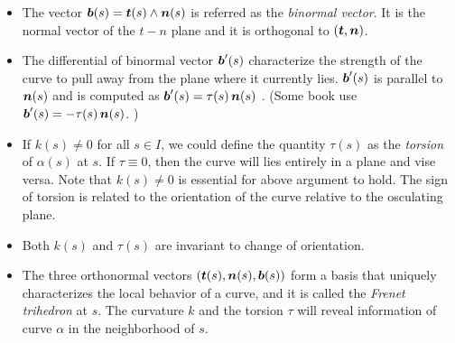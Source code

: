 \documentclass[11pt]{article}
\begin{document}
\begin{itemize}
\item \begin{definition}
The vector $\boldsymbol{b}(s) = \boldsymbol{t}(s) \wedge \boldsymbol{n}(s)$ is referred as the \emph{binormal vector}. It is the normal vector of the $t-n$ plane and it is orthogonal to $(\boldsymbol{t}, \boldsymbol{n})$. 
\end{definition}

\item The differential of binormal vector $\boldsymbol{b}'(s)$ characterize the strength of the curve to pull away from the plane where it currently lies. $\boldsymbol{b}'(s)$ is parallel to $\boldsymbol{n}(s)$ and is computed as $\boldsymbol{b}'(s) = \tau(s)\,\boldsymbol{n}(s)$ \citep{do1976differential}. (Some book use $\boldsymbol{b}'(s) = -\tau(s)\,\boldsymbol{n}(s)$. )

\item If $k(s)\neq 0$ for all $s\in I$, we could define the quantity $\tau(s)$ as the \emph{torsion} of $\alpha(s)$ at $s$. If $\tau \equiv 0$, then the curve will lies entirely in a plane and vise versa.   Note that $k(s)\neq 0$ is essential for above argument to hold. The sign of torsion is related to the orientation of the curve relative to the osculating plane. 

\item Both $k(s)$ and $\tau(s)$ are invariant to change of orientation. 

\item  \begin{definition}
The three orthonormal vectors $(\boldsymbol{t}(s), \boldsymbol{n}(s), \boldsymbol{b}(s))$ form a basis that uniquely characterizes the local behavior of a curve, and it is called the \emph{Frenet trihedron} at $s$. The curvature $k$ and the torsion $\tau$ will reveal information of curve $\alpha$ in the neighborhood of $s$.


\end{definition}
\end{itemize}
\end{document}
